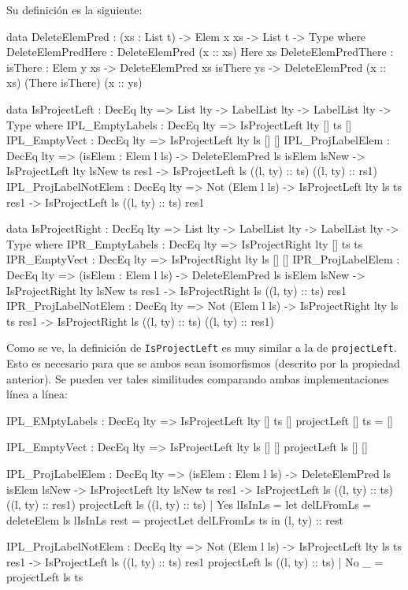 Su definición es la siguiente:

\begin{code}
data DeleteElemPred : (xs : List t) -> Elem x xs ->
  List t -> Type where
  DeleteElemPredHere : DeleteElemPred (x :: xs) Here xs
  DeleteElemPredThere : {isThere : Elem y xs} ->
    DeleteElemPred xs isThere ys ->
    DeleteElemPred (x :: xs) (There isThere) (x :: ys)

data IsProjectLeft : DecEq lty => List lty -> LabelList lty ->
  LabelList lty -> Type where
  IPL_EmptyLabels : DecEq lty => IsProjectLeft {lty} [] ts []
  IPL_EmptyVect : DecEq lty => IsProjectLeft {lty} ls [] []
  IPL_ProjLabelElem : DecEq lty => (isElem : Elem l ls) ->
    DeleteElemPred ls isElem lsNew ->
    IsProjectLeft {lty} lsNew ts res1 ->
    IsProjectLeft ls ((l, ty) :: ts) ((l, ty) :: rs1)
  IPL_ProjLabelNotElem : DecEq lty => Not (Elem l ls) ->
    IsProjectLeft {lty} ls ts res1 ->
    IsProjectLeft ls ((l, ty) :: ts) res1

data IsProjectRight : DecEq lty => List lty -> LabelList lty ->
  LabelList lty -> Type where
  IPR_EmptyLabels : DecEq lty => IsProjectRight {lty} [] ts ts
  IPR_EmptyVect : DecEq lty => IsProjectRight {lty} ls [] []
  IPR_ProjLabelElem : DecEq lty => (isElem : Elem l ls) ->
    DeleteElemPred ls isElem lsNew ->
    IsProjectRight {lty} lsNew ts res1 ->
    IsProjectRight ls ((l, ty) :: ts) res1
  IPR_ProjLabelNotElem : DecEq lty => Not (Elem l ls) ->
    IsProjectRight {lty} ls ts res1 ->
    IsProjectRight ls ((l, ty) :: ts) ((l, ty) :: res1)
\end{code}

Como se ve, la definición de \texttt{IsProjectLeft} es muy similar a la de \texttt{projectLeft}. Esto es necesario para que se ambos sean isomorfismos (descrito por la propiedad anterior). Se pueden ver tales similitudes comparando ambas implementaciones línea a línea:

\begin{code}
IPL_EMptyLabels : DecEq lty => IsProjectLeft {lty} [] ts []
projectLeft [] ts = []

IPL_EmptyVect : DecEq lty => IsProjectLeft {lty} ls [] []
projectLeft ls [] []

IPL_ProjLabelElem : DecEq lty => (isElem : Elem l ls) ->
  DeleteElemPred ls isElem lsNew ->
  IsProjectLeft {lty} lsNew ts res1 ->
  IsProjectLeft ls ((l, ty) :: ts) ((l, ty) :: res1)
projectLeft ls ((l, ty) :: ts) | Yes lIsInLs =
  let delLFromLs = deleteElem ls lIsInLs
    rest = projectLet delLFromLs ts
  in (l, ty) :: rest

IPL_ProjLabelNotElem : DecEq lty => Not (Elem l ls) ->
  IsProjectLeft {lty} ls ts res1 ->
  IsProjectLeft ls ((l, ty) :: ts) res1
projectLeft ls ((l, ty) :: ts) | No _ = projectLeft ls ts
\end{code}

